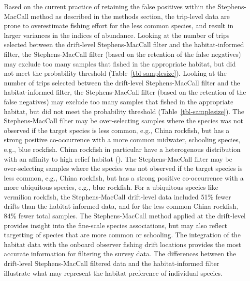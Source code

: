\documentclass[
  12pt,
  authoryear,
  preprint,
  3p]{elsarticle}
\begin{document}
Based on the current practice of retaining the false positives within
the Stephens-MacCall method as described in the methods section, the
trip-level data are prone to overestimate fishing effort for the less
common species, and result in larger variances in the indices of
abundance. Looking at the number of trips selected between the
drift-level Stephens-MacCall filter and the habitat-informed filter, the
Stephens-MacCall filter (based on the retention of the false negatives)
may exclude too many samples that fished in the appropriate habitat, but
did not meet the probability threshold (Table~\ref{tbl-samplesize}).
Looking at the number of trips selected between the drift-level
Stephens-MacCall filter and the habitat-informed filter, the
Stephens-MacCall filter (based on the retention of the false negatives)
may exclude too many samples that fished in the appropriate habitat, but
did not meet the probability threshold (Table~\ref{tbl-samplesize}). The
Stephens-MacCall filter may be over-selecting samples where the species
was not observed if the target species is less common, e.g., China
rockfish, but has a strong positive co-occurrence with a more common
midwater, schooling species, e.g., blue rockfish. China rockfish in
particular have a heterogenous distribution with an affinity to high
relief habitat (\citet{Love:2002:RNP}). The Stephens-MacCall filter may
be over-selecting samples where the species was not observed if the
target species is less common, e.g., China rockfish, but has a strong
positive co-occurrence with a more ubiquitous species, e.g., blue
rockfish. For a ubiquitous species like vermilion rockfish, the
Stephens-MacCall drift-level data included 51\% fewer drifts than the
habitat-informed data, and for the less common China rockfish, 84\%
fewer total samples. The Stephens-MacCall method applied at the
drift-level provides insight into the fine-scale species associations,
but may also reflect targetting of species that are more common or
schooling. The integration of the habitat data with the onboard observer
fishing drift locations provides the most accurate information for
filtering the survey data. The differences between the drift-level
Stephens-MacCall filtered data and the habitat-informed filter
illustrate what may represent the habitat preference of individual
species.
\end{document}
